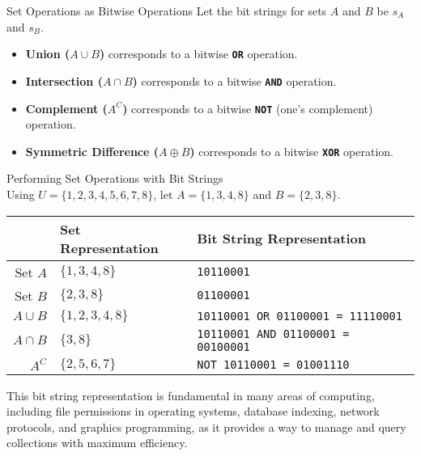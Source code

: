 \begin{custombox}{Set Operations as Bitwise Operations}
    Let the bit strings for sets $A$ and $B$ be $s_A$ and $s_B$.
    \begin{itemize}
        \item \textbf{Union ($A \cup B$)} corresponds to a bitwise \textbf{\texttt{OR}} operation.
        \item \textbf{Intersection ($A \cap B$)} corresponds to a bitwise \textbf{\texttt{AND}} operation.
        \item \textbf{Complement ($A^C$)} corresponds to a bitwise \textbf{\texttt{NOT}} (one's complement) operation.
        \item \textbf{Symmetric Difference ($A \oplus B$)} corresponds to a bitwise \textbf{\texttt{XOR}} operation.
    \end{itemize}
\end{custombox}

\begin{example}Performing Set Operations with Bit Strings\\
    Using $U = \{1, 2, 3, 4, 5, 6, 7, 8\}$, let $A = \{1, 3, 4, 8\}$ and $B = \{2, 3, 8\}$.
    
    \begin{center}
    \renewcommand{\arraystretch}{1.4}
    \begin{tabular}{rll}
         & \textbf{Set Representation} & \textbf{Bit String Representation} \\
        \hline
        Set $A$ & $\{1, 3, 4, 8\}$ & \texttt{10110001} \\
        Set $B$ & $\{2, 3, 8\}$ & \texttt{01100001} \\
        \hline
        $A \cup B$ & $\{1, 2, 3, 4, 8\}$ & \texttt{10110001 OR 01100001 = 11110001} \\
        $A \cap B$ & $\{3, 8\}$ & \texttt{10110001 AND 01100001 = 00100001} \\
        $A^C$ & $\{2, 5, 6, 7\}$ & \texttt{NOT 10110001 = 01001110} \\
    \end{tabular}
    \end{center}
\end{example}

This bit string representation is fundamental in many areas of computing, including file permissions in operating systems, database indexing, network protocols, and graphics programming, as it provides a way to manage and query collections with maximum efficiency.